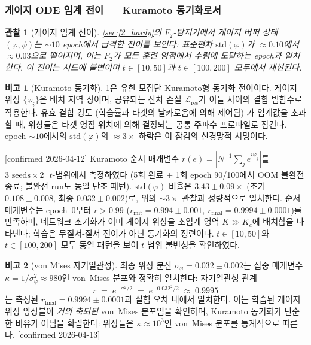 \documentclass[11pt, a4paper]{article}
\theoremstyle{definition}
\newtheorem{remark}{비고}[section]
\theoremstyle{plain}
\newtheorem{observation}[theorem]{관찰}
\begin{document}
\subsubsection{게이지 ODE 임계 전이 --- Kuramoto 동기화로서}
\label{sec:kuramoto}

\begin{observation}[게이지 임계 전이]
\label{obs:gauge_transition}
\cref{sec:f2_hardy}의 $F_2$-탐지기에서 게이지 버퍼 상태 $(\varphi,\psi)$는 ${\sim}10$ epoch에서 급격한 전이를 보인다: 표준편차 $\mathrm{std}(\varphi)$가 $\approx 0.10$에서 $\approx 0.03$으로 떨어지며, 이는 $F_2$가 모든 훈련 영점에서 수렴에 도달하는 epoch과 일치한다. 이 전이는 시드에 불변이며 $t\in[10,50]$과 $t\in[100,200]$ 모두에서 재현된다.
\end{observation}

\begin{remark}[Kuramoto 동기화]
\label{rem:kuramoto_transition}
\cref{obs:gauge_transition}은 유한 모집단 Kuramoto형 동기화 전이이다. 게이지 위상 $\{\varphi_i\}$은 배치 지역 장이며, 공유되는 잔차 손실 $\mathcal{L}_{\mathrm{res}}$가 이들 사이의 결합 범함수로 작용한다. 유효 결합 강도 (학습률과 타겟의 날카로움에 의해 제어됨) 가 임계값을 초과할 때, 위상들은 타겟 영점 위치에 의해 결정되는 공통 주파수 프로파일로 잠긴다. epoch $\sim 10$에서의 $\mathrm{std}(\varphi)$의 $\approx 3\times$ 하락은 이 잠김의 신경망적 서명이다.

[confirmed 2026-04-12]
Kuramoto 순서 매개변수 $r(e)=|N^{-1}\sum_j e^{i\varphi_j}|$를
$3\text{ seeds}\times 2\text{ }t$-범위에서 측정하였다
(5회 완료 + 1회 epoch 90/100에서 OOM 불완전 종료; 불완전 run도 동일 단조 패턴).
$\mathrm{std}(\varphi)$ 비율은 $3.43\pm0.09\times$
(초기 $0.108\pm0.008$, 최종 $0.032\pm0.002$)로,
위의 ${\sim}3\times$ 관찰과 정량적으로 일치한다.
순서 매개변수는 epoch~$0$부터 $r>0.99$
($r_{\mathrm{init}}=0.994\pm0.001$, $r_{\mathrm{final}}=0.9994\pm0.0001$)를
만족하며, 네트워크 초기화가 이미 게이지 위상을 초임계 영역 $K\gg K_c$에
배치함을 나타낸다; 학습은 무질서-질서 전이가 아닌 동기화의 정련이다.
$t\in[10,50]$와 $t\in[100,200]$ 모두 동일 패턴을 보여 $t$-범위 불변성을 확인하였다.
\end{remark}

\begin{remark}[von Mises 자기일관성]
\label{rem:von_mises}
최종 위상 분산 $\sigma_\varphi = 0.032 \pm 0.002$는
집중 매개변수 $\kappa = 1/\sigma_\varphi^2 \approx 980$인
von~Mises 분포와 정확히 일치한다: 자기일관성 관계
\[
  r \;=\; e^{-\sigma^2/2} \;=\; e^{-0.032^2/2} \;\approx\; 0.9995
\]
는 측정된 $r_{\mathrm{final}} = 0.9994 \pm 0.0001$과
실험 오차 내에서 일치한다. 이는 학습된 게이지 위상 앙상블이
\emph{거의 축퇴된} von~Mises 분포임을 확인하며,
Kuramoto 동기화가 단순한 비유가 아님을 확립한다:
위상들은 $\kappa \approx 10^3$인 von~Mises 분포를
통계적으로 따른다.
[confirmed 2026-04-13]
\end{remark}
\end{document}
